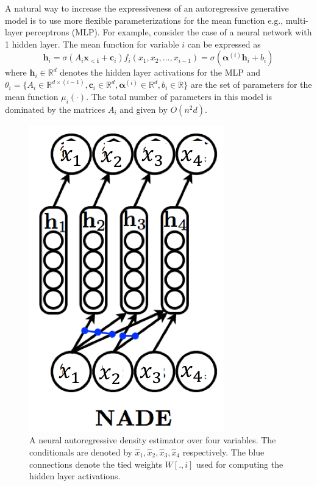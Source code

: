 A natural way to increase the expressiveness of an autoregressive generative model is to 
use more flexible parameterizations for the mean function e.g., multi-layer perceptrons 
(MLP). For example, consider the case of a neural network with 1 hidden layer. The mean 
function for variable $i$ can be expressed as
$$
\mathbf{h}_i = \sigma(A_i \mathbf{x_{< i}} + \mathbf{c}_i)
f_i(x_1, x_2, \ldots, x_{i-1}) =\sigma(\boldsymbol{\alpha}^{(i)}\mathbf{h}_i +b_i )
$$
where $\mathbf{h}_i \in \mathbb{R}^d$ denotes the hidden layer activations for the MLP 
and $\theta_i = \{A_i \in \mathbb{R}^{d\times (i-1)},  \mathbf{c}_i \in \mathbb{R}^d, 
\boldsymbol{\alpha}^{(i)}\in \mathbb{R}^d, b_i \in \mathbb{R}\}$ are the set of parameters 
for the mean function $\mu_i(\cdot)$. The total number of parameters in this model is 
dominated by the matrices $A_i$ and given by $O(n^2 d)$.

\begin{figure}[H]
\centering
\includegraphics[scale=0.618]{pix/dgm/nade.png}
\caption{A neural autoregressive density estimator over four variables. The conditionals 
are denoted by \(\widehat{x}_1, \widehat{x}_2, \widehat{x}_3, \widehat{x}_4\) 
respectively. The blue connections denote the tied weights \(W[., i]\) used for 
computing the hidden layer activations.}
\end{figure}


